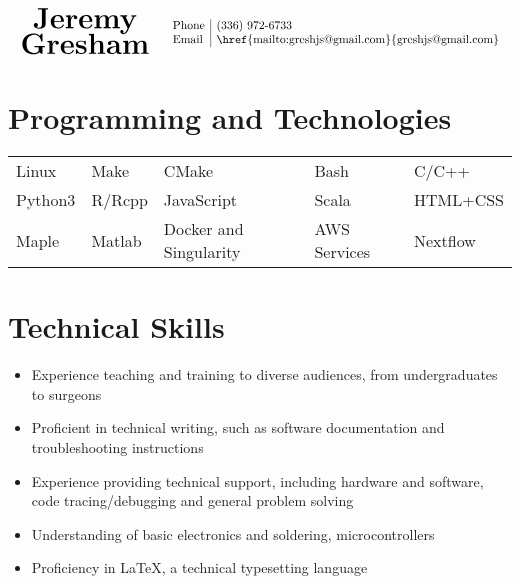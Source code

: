 \documentclass[10pt]{article}
\begin{document}
\begin{center}
  \[
\begin{array}{lr}
\begin{array}{cr}
\mbox{\bf\Huge Jeremy} \\
\mbox{\bf\Huge Gresham}
\end{array} &
\begin{array}{l|l}
\setlength{\arraycolsep}{1pt}
\mbox{Phone} & $(336) 972-6733$ \\
\mbox{Email} & $\href{mailto:greshjs@gmail.com}{greshjs@gmail.com}$ \\
\end{array}
\end{array}
\]

\end{center}


\section*{Programming and Technologies}

\begin{tabular}{lllll}
  Linux & Make & CMake & Bash & C/C++\\
  Python3 & R/Rcpp & JavaScript & Scala & HTML+CSS\\
  Maple & Matlab & Docker and Singularity & AWS Services & Nextflow
\end{tabular}

\section*{Technical Skills}

\begin{itemize}\raggedright
\setlength{\itemsep}{0pt}
\item Experience teaching and training to diverse audiences, from undergraduates to surgeons

\item Proficient in technical writing, such as software documentation and troubleshooting instructions

\item Experience providing technical support, including hardware and software, code tracing/debugging and general problem solving

\item Understanding of basic electronics and soldering, microcontrollers

\item Proficiency in {\rmfamily \LaTeX}, a technical typesetting language
  
\end{itemize}
\end{document}
